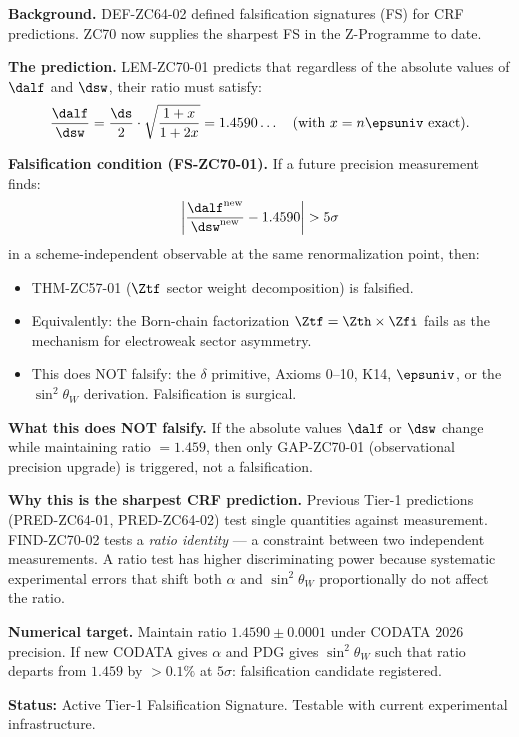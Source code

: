 \documentclass[12pt, a4paper]{article}
\renewcommand{\swsq}{\sin^2\!\theta_W}
\begin{document}
\begin{nobelbox}[title={FIND-ZC70-02: Nobel-Table Falsification
  Signature --- The Sharpest CRF Prediction}]

\textbf{Background.}
DEF-ZC64-02 defined falsification signatures (FS) for CRF
predictions. ZC70 now supplies the sharpest FS in the
Z-Programme to date.

\textbf{The prediction.}
LEM-ZC70-01 predicts that regardless of the absolute values
of $\dalf$ and $\dsw$, their ratio must satisfy:
\[
  \frac{\dalf}{\dsw}
  = \frac{\ds}{2}\cdot\sqrt{\frac{1+x}{1+2x}}
  = 1.4590\ldots
  \quad\text{(with $x = n\epsuniv$ exact)}.
\]

\textbf{Falsification condition (FS-ZC70-01).}
If a future precision measurement finds:
\[
  \left|\frac{\dalf^{\rm new}}{\dsw^{\rm new}} - 1.4590\right|
  > 5\sigma
\]
in a scheme-independent observable at the same renormalization
point, then:
\begin{itemize}[leftmargin=2em, noitemsep]
  \item THM-ZC57-01 ($\Ztf$ sector weight decomposition) is falsified.
  \item Equivalently: the Born-chain factorization
    $\Ztf = \Zth\times\Zfi$ fails as the mechanism for
    electroweak sector asymmetry.
  \item This does NOT falsify: the $\delta$ primitive,
    Axioms 0--10, K14, $\epsuniv$, or the $\sin^2\theta_W$
    derivation. Falsification is surgical.
\end{itemize}

\textbf{What this does NOT falsify.}
If the absolute values $\dalf$ or $\dsw$ change while
maintaining ratio $= 1.459$, then only GAP-ZC70-01
(observational precision upgrade) is triggered, not
a falsification.

\textbf{Why this is the sharpest CRF prediction.}
Previous Tier-1 predictions (PRED-ZC64-01, PRED-ZC64-02)
test single quantities against measurement.
FIND-ZC70-02 tests a \emph{ratio identity} --- a constraint
between two independent measurements. A ratio test has
higher discriminating power because systematic experimental
errors that shift both $\alpha$ and $\swsq$ proportionally
do not affect the ratio.

\textbf{Numerical target.}
Maintain ratio $1.4590 \pm 0.0001$ under CODATA 2026
precision. If new CODATA gives $\alpha$ and PDG gives
$\swsq$ such that ratio departs from $1.459$ by $>0.1\%$
at $5\sigma$: falsification candidate registered.

\textbf{Status:} Active Tier-1 Falsification Signature.
Testable with current experimental infrastructure.
\end{nobelbox}
\end{document}
